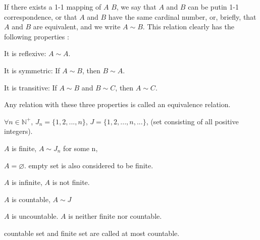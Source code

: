 \begin{mydef}
    \label{mydef:2.3}
    If there exists a 1-1 mapping of $A$  $B$, we say that $A$ and $B$ can be putin 1-1 correspondence, or that $A$ and $B$ have the same cardinal number, or, briefly, that $A$ and $B$ are equivalent, and we write $A\sim B$. This relation
    clearly has the following properties :

    It is reflexive: $A\sim A$.

    It is symmetric: If $A\sim B$, then $B\sim A$.

    It is transitive: If $A\sim B$ and $B\sim C$, then $A\sim C$.

    Any relation with these three properties is called an equivalence relation.    
\end{mydef}

\begin{mydef}
    \label{mydef:2.4}
    $\forall n\in \mathbb{N}^+$, $J_n = \{1,2,...,n\}$, $J = \{1,2,...,n,...\}$, (set consisting of all positive integers).

    $A$ is finite, $A\sim J_n$ for some n,

    $A = \varnothing$. empty set is also considered to be finite.

    $A$ is infinite, $A$ is not finite.

    $A$ is countable, $A \sim J$
    
    $A$ is uncountable. $A$ is neither finite nor countable.

    countable set and finite set are called at most countable.
\end{mydef}


